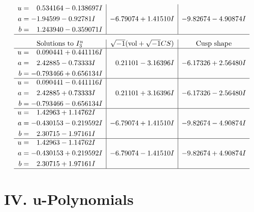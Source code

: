 \documentclass[1p]{elsarticle_modified}
\theoremstyle{definition}
\newcommand{\I}{\sqrt{-1}}
\begin{document}
$$\begin{array}{c|c|c}
\begin{aligned}
u &= \phantom{-}0.534164 - 0.138697 I \\
a &= -1.94599 - 0.92781 I \\
b &= \phantom{-}1.243940 - 0.359071 I\end{aligned}
 & -6.79074 + 1.41510 I & -9.82674 - 4.90874 I\\
 \hline 
 \end{array}$$\newpage$$\begin{array}{c|c|c}  
\text{Solutions to }I^u_{3}& \I (\text{vol} + \sqrt{-1}CS) & \text{Cusp shape}\\
 \hline 
\begin{aligned}
u &= \phantom{-}0.090441 + 0.441116 I \\
a &= \phantom{-}2.42885 - 0.73333 I \\
b &= -0.793466 + 0.656134 I\end{aligned}
 & \phantom{-}0.21101 - 3.16396 I & -6.17326 + 2.56480 I \\ \hline\begin{aligned}
u &= \phantom{-}0.090441 - 0.441116 I \\
a &= \phantom{-}2.42885 + 0.73333 I \\
b &= -0.793466 - 0.656134 I\end{aligned}
 & \phantom{-}0.21101 + 3.16396 I & -6.17326 - 2.56480 I \\ \hline\begin{aligned}
u &= \phantom{-}1.42963 + 1.14762 I \\
a &= -0.430153 - 0.219592 I \\
b &= \phantom{-}2.30715 - 1.97161 I\end{aligned}
 & -6.79074 + 1.41510 I & -9.82674 - 4.90874 I \\ \hline\begin{aligned}
u &= \phantom{-}1.42963 - 1.14762 I \\
a &= -0.430153 + 0.219592 I \\
b &= \phantom{-}2.30715 + 1.97161 I\end{aligned}
 & -6.79074 - 1.41510 I & -9.82674 + 4.90874 I\\
 \hline 
 \end{array}$$\newpage
\newpage\renewcommand{\arraystretch}{1}
\centering \section*{ IV. u-Polynomials}
\end{document}
